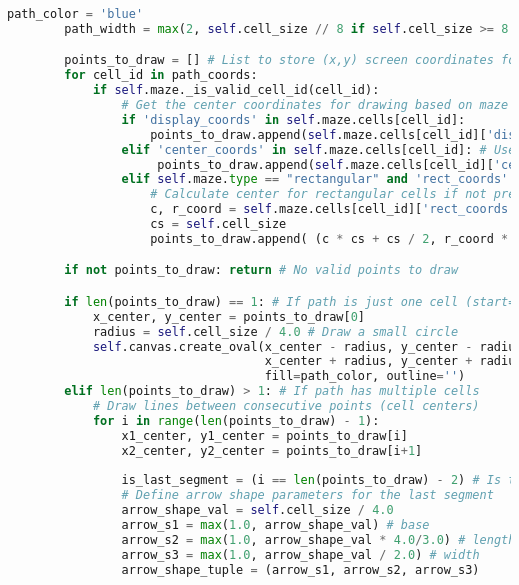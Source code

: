 \documentclass[UTF8]{report}
\theoremstyle{MyLineTheoremStyle} %
\theoremstyle{MyBlockTheoremStyle} %
\theoremstyle{MySubsubsectionStyle} %
\begin{document}
\begin{lstlisting}[language=Python, caption={迷宫生成与求解程序代码}]
        path_color = 'blue'
        path_width = max(2, self.cell_size // 8 if self.cell_size >= 8 else 1) # Adaptive path width

        points_to_draw = [] # List to store (x,y) screen coordinates for path segments
        for cell_id in path_coords:
            if self.maze._is_valid_cell_id(cell_id):
                # Get the center coordinates for drawing based on maze type and available data
                if 'display_coords' in self.maze.cells[cell_id]: 
                    points_to_draw.append(self.maze.cells[cell_id]['display_coords'])
                elif 'center_coords' in self.maze.cells[cell_id]: # Used by triangular
                     points_to_draw.append(self.maze.cells[cell_id]['center_coords'])
                elif self.maze.type == "rectangular" and 'rect_coords' in self.maze.cells[cell_id]:
                    # Calculate center for rectangular cells if not pre-calculated
                    c, r_coord = self.maze.cells[cell_id]['rect_coords'] 
                    cs = self.cell_size
                    points_to_draw.append( (c * cs + cs / 2, r_coord * cs + cs / 2) )

        if not points_to_draw: return # No valid points to draw

        if len(points_to_draw) == 1: # If path is just one cell (start=end)
            x_center, y_center = points_to_draw[0]
            radius = self.cell_size / 4.0 # Draw a small circle
            self.canvas.create_oval(x_center - radius, y_center - radius, 
                                    x_center + radius, y_center + radius, 
                                    fill=path_color, outline='')
        elif len(points_to_draw) > 1: # If path has multiple cells
            # Draw lines between consecutive points (cell centers)
            for i in range(len(points_to_draw) - 1):
                x1_center, y1_center = points_to_draw[i]
                x2_center, y2_center = points_to_draw[i+1]
                
                is_last_segment = (i == len(points_to_draw) - 2) # Is this the last segment of the path?
                # Define arrow shape parameters for the last segment
                arrow_shape_val = self.cell_size / 4.0 
                arrow_s1 = max(1.0, arrow_shape_val) # base
                arrow_s2 = max(1.0, arrow_shape_val * 4.0/3.0) # length
                arrow_s3 = max(1.0, arrow_shape_val / 2.0) # width
                arrow_shape_tuple = (arrow_s1, arrow_s2, arrow_s3)
                

\end{lstlisting}
\end{document}
